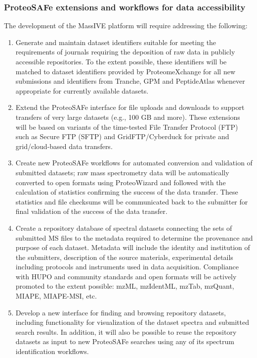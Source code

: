\documentclass[arial,11pt]{article}
\begin{document}
\subsubsection{ProteoSAFe extensions and workflows for data accessibility}

The development of the MassIVE platform will require addressing the following:

\begin{enumerate}
\item Generate and maintain dataset identifiers suitable for meeting the requirements of journals requiring the deposition of raw data in publicly accessible repositories. To the extent possible, these identifiers will be matched to dataset identifiers provided by ProteomeXchange for all new submissions and identifiers from Tranche, GPM and PeptideAtlas whenever appropriate for currently available datasets.

\item Extend the ProteoSAFe interface for file uploads and downloads to support transfers of very large datasets (e.g., 100 GB and more). These extensions will be based on variants of the time-tested File Transfer Protocol (FTP) such as Secure FTP (SFTP) and GridFTP/Cyberduck for private and grid/cloud-based data transfers.

\item Create new ProteoSAFe workflows for automated conversion and validation of submitted datasets; raw mass spectrometry data will be automatically converted to open formats using ProteoWizard and followed with the calculation of statistics confirming the success of the data transfer. These statistics and file checksums will be communicated back to the submitter for final validation of the success of the data transfer.

\item Create a repository database of spectral datasets connecting the sets of submitted MS files to the metadata required to determine the provenance and purpose of each dataset. Metadata will include the identity and institution of the submitters, description of the source materials, experimental details including protocols and instruments used in data acquisition. Compliance with HUPO and community standards and open formats will be actively promoted to the extent possible: mzML, mzIdentML, mzTab, mzQuant, MIAPE, MIAPE-MSI, etc.

\item Develop a new interface for finding and browsing repository datasets, including functionality for visualization of the dataset spectra and submitted search results.  In addition, it will also be possible
to reuse the repository datasets as input to new ProteoSAFe searches using any of its spectrum identification workflows.
\end{enumerate}
\end{document}
